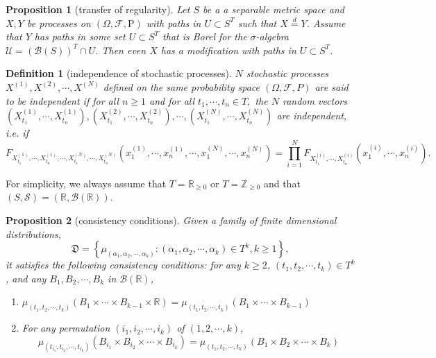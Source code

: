 \documentclass{report}
\newtheorem{definition}{Definition}[section]
\newtheorem{proposition}{Proposition}[section]
\theoremstyle{nonumberplain}
\begin{document}
\begin{proposition}[transfer of regularity]
		Let $S$ be a a separable metric space and $X, Y$ be processes on $(\Omega ,{\mathcal{F}},\mathrm{P})$ with paths in $U \subset S^T$ such that $X \stackrel{d}{=} Y$. Assume that $Y$ has paths in some set $U \subset S^{T}$ that is Borel for the $\sigma$-algebra $\mathcal{U}=(\mathcal{B}(S))^{T}\cap U$. Then even $X$ has a modification with paths in $U \subset S^{T}$.
\end{proposition}

\begin{definition}[independence of stochastic processes]
	$N$ stochastic processes $X^{(1)},X^{(2)},\cdots,X^{(N)}$ defined on the same probability space $(\Omega, \mathcal{F}, P)$ are said to be independent if for all $n\ge1$ and for all $t_{1}, \cdots, t_{n} \in T,$ the $N$ random vectors $\left(X^{(1)}_{t_{1}}, \cdots, X^{(1)}_{t_{n}}\right), \left(X^{(2)}_{t_{1}}, \cdots, X^{(2)}_{t_{n}}\right),\cdots,\left(X^{(N)}_{t_{1}}, \cdots, X^{(N)}_{t_{n}}\right)$ are independent, i.e. if
	\[
	F_{X^{(1)}_{t_{1}}, \cdots, X^{(1)}_{t_{n}}, \cdots, X^{(N)}_{t_{1}}, \cdots, X^{(N)}_{t_{n}}}\left(x^{(1)}_{1}, \cdots, x^{(1)}_{n}, \cdots, x^{(N)}_{1}, \cdots, x^{(N)}_{n}\right)=\prod_{i=1}^N F_{X^{(i)}_{t_1}, \cdots, X^{(i)}_{t_{n}}}\left(x^{(i)}_{1}, \cdots, x^{(i)}_{n}\right) .
	\]
\end{definition}

For simplicity, we always assume that $T=\mathbb{R}_{\ge 0}$ or $T=\mathbb{Z}_{\ge 0}$ and that $(S,\mathcal{S})=(\mathbb{R},\mathcal{B}(\mathbb{R}))$.

\begin{proposition}[consistency conditions]
	Given a family of finite dimensional distributions,
	$$
	\mathfrak{D}=\left\{\mu_{\left(\alpha_{1}, \alpha_{2}, \cdots, \alpha_{k}\right)}:\left(\alpha_{1}, \alpha_{2}, \cdots, \alpha_{k}\right) \in T^{k}, k\ge1 \right\},
	$$
	it satisfies the following consistency conditions: for any $k\ge2$, $\left(t_{1}, t_{2}, \cdots, t_{k}\right) \in T^k$, and any $B_{1}, B_{2}, \cdots, B_{k}$ in $\mathcal{B}(\mathbb{R})$,
	\begin{enumerate}
		\item[(C1)] $\mu_{\left(t_{1}, t_{2}, \cdots, t_{k}\right)}\left(B_{1} \times \cdots \times B_{k-1} \times \mathbb{R}\right)=\mu_{\left(t_{1}, t_{2}, \cdots, t_{k}\right)}\left(B_{1} \times \cdots \times B_{k-1}\right)$
		\item[(C2)] For any permutation $\left(i_{1}, i_{2}, \cdots, i_{k}\right)$ of $(1,2, \cdots, k)$,
		\[
		\mu_{\left(t_{i_{1}}, t_{i_{2}}, \cdots, t_{i_{k}}\right)}\left(B_{i_{1}} \times B_{i_{2}} \times \cdots \times B_{i_{k}}\right)=\mu_{\left(t_{1}, t_{2}, \cdots, t_{k}\right)}\left(B_{1} \times B_{2} \times \cdots \times B_{k}\right)
		\]
	\end{enumerate}
\end{proposition}
\end{document}
